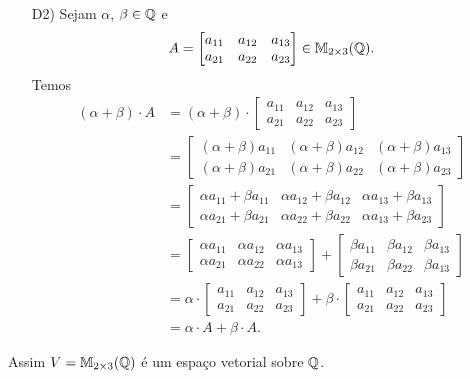 \begin{exemplo}
\begin{enumerate}[label={\arabic*})]
\begin{solucao}
\begin{itemize}
              \item[D2)] Sejam $\alpha$, $\beta \in \mathbb{Q}$ e
                \[
                  A = \begin{bmatrix} a_{11} & a_{12} & a_{13}\\a_{21} & a_{22} & a_{23}\end{bmatrix} \in \mathbb{M}_{2 \times 3}(\mathbb{Q}).
                \]
                Temos
                \begin{align*}
                  (\alpha + \beta)\cdot A & = (\alpha + \beta)\cdot\begin{bmatrix} a_{11} & a_{12} & a_{13}\\a_{21} & a_{22} & a_{23}\end{bmatrix}
                  \\ &= \begin{bmatrix} (\alpha + \beta)a_{11} & (\alpha + \beta)a_{12} & (\alpha + \beta)a_{13}\\(\alpha + \beta)a_{21} & (\alpha + \beta)a_{22} & (\alpha + \beta)a_{23}\end{bmatrix}
                  \\ &= \begin{bmatrix} \alpha a_{11} + \beta a_{11} & \alpha a_{12} + \beta a_{12} & \alpha a_{13} + \beta a_{13}\\\alpha a_{21} + \beta a_{21} & \alpha a_{22} + \beta a_{22} & \alpha a_{13} + \beta a_{23}\end{bmatrix}
                  \\ &= \begin{bmatrix} \alpha a_{11} & \alpha a_{12} & \alpha a_{13} \\ \alpha a_{21} & \alpha a_{22} & \alpha a_{13} \end{bmatrix}
                  + \begin{bmatrix} \beta a_{11} & \beta a_{12} & \beta a_{13} \\ \beta a_{21} & \beta a_{22} & \beta a_{13} \end{bmatrix}
                  \\ &= \alpha\cdot\begin{bmatrix} a_{11} & a_{12} & a_{13}\\a_{21} & a_{22} & a_{23}\end{bmatrix}  + \beta\cdot\begin{bmatrix} a_{11} & a_{12} & a_{13}\\a_{21} & a_{22} & a_{23}\end{bmatrix}
                  \\ &= \alpha\cdot A + \beta\cdot A.
                \end{align*}
            \end{itemize}
            Assim $V = \mathbb{M}_{2 \times 3}(\mathbb{Q})$ é um espaço vetorial sobre $\mathbb{Q}$.
          \end{solucao}


\end{enumerate}
\end{exemplo}

